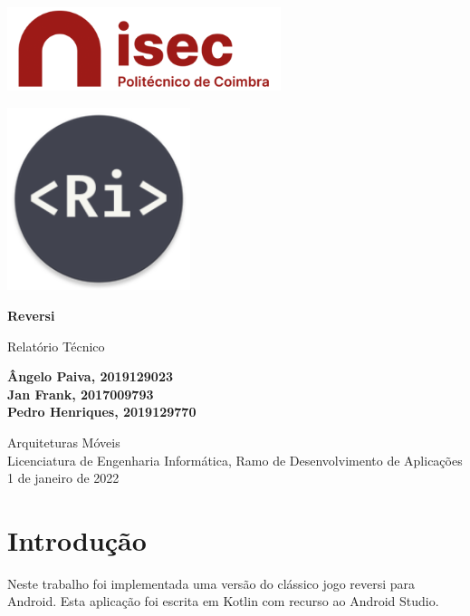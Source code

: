 \documentclass[11pt]{article}
\begin{document}
	\begin{titlepage}
		\begin{center}
			\includegraphics[width=0.6\textwidth]{logo-isec}
			
			\vspace*{\fill}
			
			\includegraphics[width=0.4\textwidth]{icon-reversi}
			
			\Huge
			\textbf{Reversi}
			
			\huge
			Relatório Técnico
			
			\vspace{2cm}
			
			\Large
			\textbf{
				Ângelo Paiva, 2019129023 \\
				Jan Frank, 2017009793 \\
				Pedro Henriques, 2019129770
			}
			
			\vfill
			\vspace*{\fill}
			
			\normalsize
			Arquiteturas Móveis \\
			Licenciatura de Engenharia Informática, Ramo de Desenvolvimento de Aplicações \\
			1 de janeiro de 2022		
		\end{center}
	\end{titlepage}

	\tableofcontents
	\pagebreak
	
	\large
	\section{Introdução}
	\normalsize
	
	Neste trabalho foi implementada uma versão do clássico jogo reversi para Android. Esta aplicação foi escrita em Kotlin com recurso ao Android Studio.
	
\end{document}
